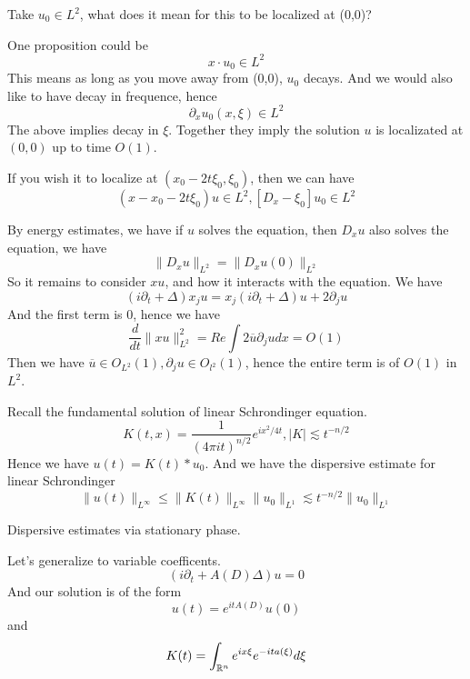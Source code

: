Take $u_0\in L^2$, what does it mean for this to be localized at (0,0)?

One proposition could be
\begin{equation*}
    x\cdot u_0\in L^2
\end{equation*}
This means as long as you move away from (0,0), $u_0$ decays. And we would also like to have decay in frequence, hence
\begin{equation*}
    \partial_xu_0(x,\xi)\in L^2
\end{equation*}
The above implies decay in $\xi$. Together they imply the solution $u$ is localizated at $(0,0)$ up to time $O(1)$.

If you wish it to localize at $(x_0-2t\xi_0, \xi_0)$, then we can have
\begin{equation*}
    (x-x_0-2t\xi_0)u\in L^2, [D_x-\xi_0]u_0\in L^2
\end{equation*}

By energy estimates, we have if $u$ solves the equation, then $D_xu$ also solves the equation, we have
\begin{equation*}
    \|D_xu\|_{L^2}=\|D_xu(0)\|_{L^2}
\end{equation*}
So it remains to consider $xu$, and how it interacts with the equation. We have
\begin{equation*}
    (i\partial_t+\Delta)x_ju=x_j(i\partial_t+\Delta)u+2\partial_ju
\end{equation*}
And the first term is 0, hence we have
\begin{equation*}
    \frac{d}{dt}\|xu\|_{L^2}^2=Re\int 2\overline{u}\partial_j udx=O(1)
\end{equation*}
Then we have $\overline{u}\in O_{L^2}(1), \partial_j u\in O_{l^2}(1)$, hence the entire term is of $O(1)$ in $L^2$.

Recall the fundamental solution of linear Schrondinger equation.
\begin{equation*}
    K(t,x)=\frac{1}{(4\pi it)^{n/2}}e^{ix^2/4t}, |K|\lesssim t^{-n/2}
\end{equation*}
Hence we have $u(t)=K(t)\ast u_0$. 
And we have the dispersive estimate for linear Schrondinger
\begin{equation*}
    \|u(t)\|_{L^\infty}\leq\|K(t)\|_{L^\infty}\|u_0\|_{L^1}\lesssim t^{-n/2}\|u_0\|_{L^1}
\end{equation*}

Dispersive estimates via stationary phase.

Let's generalize to variable coefficents.
\begin{equation*}
    (i\partial_t+A(D)\Delta)u=0
\end{equation*}
And our solution is of the form
\begin{equation*}
    u(t)=e^{itA(D)}u(0)
\end{equation*}
and
\begin{equation*}
    K(t)=\int_{\mathbb{R}^n}e^{ix\xi}e^{-ita(\xi)}d\xi
\end{equation*}


